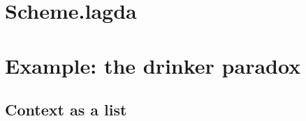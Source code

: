 \documentclass{article}
\theoremstyle{definition}
\theoremstyle{plain}
\begin{document}
\section{Scheme.lagda}


\section{Example: the drinker paradox}


{}


\begin{appendices}

\section{Context as a list}


\end{appendices}
\end{document}
